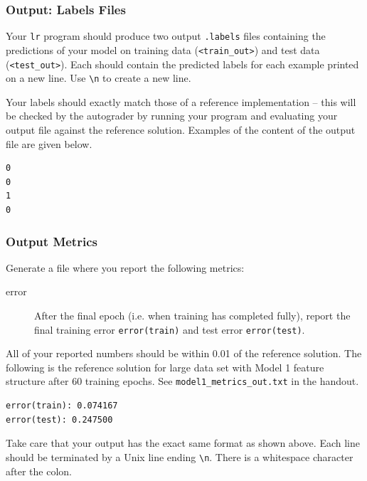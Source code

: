\subsubsection{Output: Labels Files} \label{output}
Your \lstinline{lr} program should produce two output \texttt{.labels} files containing the predictions of your model on training data (\texttt{<train\_out>}) and test data (\texttt{<test\_out>}). Each should contain the predicted labels for each example printed on a new line. Use \lstinline{\n} to create a new line. 

Your labels should exactly match those of a reference implementation -- this will be checked by the autograder by running your program and evaluating your output file against the reference solution. Examples of the content of the output file are given below.

\begin{lstlisting}
0
0
1
0
\end{lstlisting}

\subsubsection{Output Metrics} \label{metrics}
Generate a file where you report the following metrics: 

\begin{description}

\item[error] After the final epoch (i.e. when training has completed fully), report the final training error \newline \lstinline{error(train)} and test error \lstinline{error(test)}. 
\end{description}

All of your reported numbers should be within 0.01 of the reference solution. The following is the reference solution for large data set with Model 1 feature structure after 60 training epochs. See \newline \lstinline{model1_metrics_out.txt} in the handout.

\begin{lstlisting}
error(train): 0.074167
error(test): 0.247500
\end{lstlisting}

Take care that your output has the exact same format as shown above. Each line should be terminated by a Unix line ending \lstinline{\n}. There is a whitespace character after the colon.



